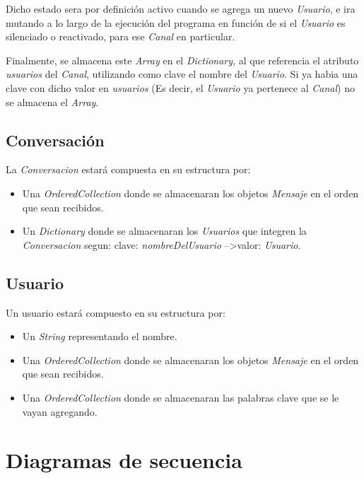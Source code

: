 \documentclass[titlepage,a4paper]{article}
\begin{document}
Dicho estado sera por definición activo cuando se agrega un nuevo \textit{Usuario}, e ira mutando a lo largo de la ejecución del programa en función de si el \textit{Usuario} es silenciado o reactivado, para ese \textit{Canal} en particular.

Finalmente, se almacena este \textit{Array} en el \textit{Dictionary}, al que referencia el atributo \textit{usuarios} del \textit{Canal}, utilizando como clave el nombre del \textit{Usuario}. Si ya habia una clave con dicho valor en \textit{usuarios} (Es decir, el \textit{Usuario} ya pertenece al \textit{Canal}) no se almacena el \textit{Array}. 

\subsection{Conversación}\label{subsec:implementacionConversacion}

La \textit{Conversacion} estará compuesta en su estructura por:

\begin{itemize}
	\item Una \textit{OrderedCollection} donde se almacenaran los objetos \textit{Mensaje} en el orden que sean recibidos.
	\item Un \textit{Dictionary} donde se almacenaran los \textit{Usuarios} que integren la \textit{Conversacion} segun:
	\subitem clave: \textit{nombreDelUsuario} \quad-->\quad valor: \textit{Usuario}.
\end{itemize}

\subsection{Usuario}\label{subsec:implementacionUsuario}

Un usuario estará compuesto en su estructura por:

\begin{itemize}
	\item Un \textit{String} representando el nombre.
	\item Una \textit{OrderedCollection} donde se almacenaran los objetos \textit{Mensaje} en el orden que sean recibidos.
	\item Una \textit{OrderedCollection} donde se almacenaran las palabras clave que se le vayan agregando.
\end{itemize}

\section{Diagramas de secuencia}\label{sec:diagramasdesecuencia}
\end{document}
